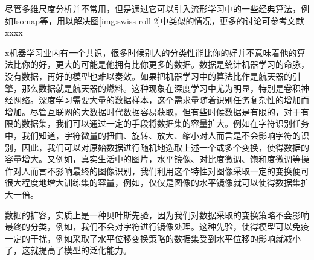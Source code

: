 尽管多维尺度分析并不常用，但是通过它可以引入流形学习中的一些经典算法，例如Isomap等，用以解决图\ref{img:swiss roll 2}中类似的情况，更多的讨论可参考文献xxxx

x机器学习业内有一个共识，很多时候别人的分类性能比你的好并不意味着他的算法比你的好，更大的可能是他拥有比你更多的数据。数据是统计机器学习的命脉，没有数据，再好的模型也难以奏效。如果把机器学习中的算法比作是航天器的引擎，那么数据就是航天器的燃料。这种现象在深度学习中尤为明显，特别是卷积神经网络。深度学习需要大量的数据样本，这个需求量随着识别任务复杂性的增加而增加。尽管互联网的大数据时代数据容易获取，但有些时候数据是有限的，对于有限的数据集，我们可以通过一定的手段将数据集的容量扩大。例如在字符识别任务中，我们知道，字符微量的扭曲、旋转、放大、缩小对人而言是不会影响字符的识别，因此，我们可以对原始数据进行随机地选取上述一个或多个变换，使得数据的容量增大。又例如，真实生活中的图片，水平镜像、对比度微调、饱和度微调等操作对人而言不影响最终的图像识别，我们利用这个特性对图像采取一定的变换便可很大程度地增大训练集的容量，例如，仅仅是图像的水平镜像就可以使得数据集扩大一倍。

数据的扩容，实质上是一种贝叶斯先验，因为我们对数据采取的变换策略不会影响最终的分类，例如，我们不会对字符进行镜像处理。这种先验，使得模型可以免疫一定的干扰，例如采取了水平位移变换策略的数据集受到水平位移的影响就减小了，这就提高了模型的泛化能力。


